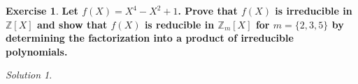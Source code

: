 \documentclass[a4paper,twoside=false,abstract=false,numbers=noenddot,
titlepage=false,headings=small,parskip=half,version=last]{scrartcl}
\theoremstyle{definition}
\newtheorem{exercise}{Exercise}
\theoremstyle{remark}
\newtheorem*{solution}{Solution}
\newcommand{\ZZ}{\ensuremath{\mathbb{Z}}}
\begin{document}
\begin{exercise}
{\bf
Let $f(X)=X^4-X^2+1$. Prove that $f(X)$ is irreducible in $\ZZ\left[X\right]$
and show that $f(X)$ is reducible in $\ZZ_m\left[X\right]$ for
$m=\{2,3,5\}$ by determining the factorization into a product of
irreducible polynomials.
}
\end{exercise}
\begin{solution}

\end{solution}

\end{document}
